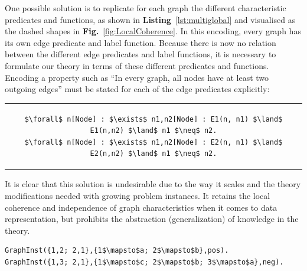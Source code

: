 One possible solution is to replicate for each graph the different characteristic predicates and functions, as shown
in \textbf{Listing}~\ref{lst:multiglobal} and visualised as the dashed shapes in \textbf{Fig.}~\ref{fig:LocalCoherence}.
In this encoding, every graph has its own edge predicate and label function. 
Because there is now no relation between the different edge predicates and label functions, it is necessary to formulate our theory in terms of these different predicates and functions.
Encoding a property such as ``In every graph, all nodes have at least two outgoing edges'' must be stated for each of the edge predicates explicitly:
\begin{center}
\begin{tabular}{c}
\begin{lstlisting}[mathescape]
$\forall$ n[Node] : $\exists$ n1,n2[Node] : E1(n, n1) $\land$ E1(n,n2) $\land$ n1 $\neq$ n2.
$\forall$ n[Node] : $\exists$ n1,n2[Node] : E2(n, n1) $\land$ E2(n,n2) $\land$ n1 $\neq$ n2.
\end{lstlisting}
\end{tabular}
\end{center}

It is clear that this solution is undesirable due to the way it scales and the theory modifications needed with growing problem instances.
It retains the local coherence and independence of graph characteristics when it comes to data representation, but prohibits the abstraction (generalization) of knowledge in the theory.

\begin{center}
\begin{minipage}{0.68\linewidth}
\begin{lstlisting}[mathescape,caption=Higher order predicate modeling the set $\graphset{G}$ of Def~\ref{def:gm2}.,label=lst:HOPred]
GraphInst({1,2; 2,1},{1$\mapsto$a; 2$\mapsto$b},pos).
GraphInst({1,3; 2,1},{1$\mapsto$c; 2$\mapsto$b; 3$\mapsto$a},neg).
\end{lstlisting}
\end{minipage}
\end{center}

